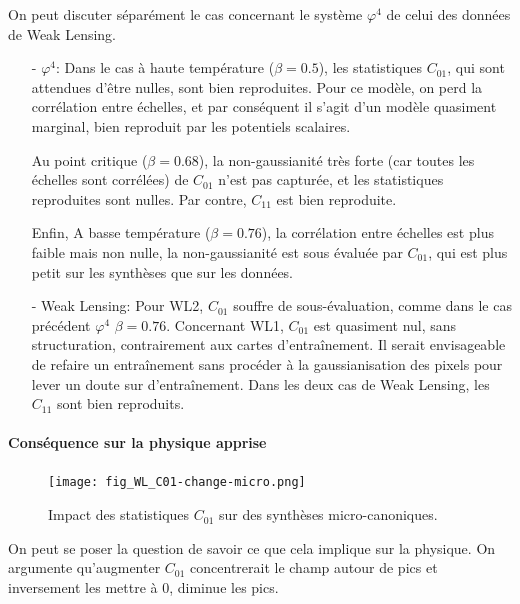 \documentclass[12pt,twoside]{article}
\begin{document}
On peut discuter séparément le cas concernant le système $\varphi^4$ de celui des données de Weak Lensing.
\begin{itemize}
\item[- $\varphi^4$:]
Dans le cas à haute température ($\beta = 0.5$), les statistiques $C_{01}$, qui sont attendues d'être nulles, sont bien reproduites. Pour ce modèle, on perd la corrélation entre échelles, et par conséquent il s'agit d'un modèle quasiment marginal, bien reproduit par les potentiels scalaires. 

Au point critique ($\beta= 0.68$), la non-gaussianité très forte (car toutes les échelles sont corrélées) de $C_{01}$ n'est pas capturée, et les statistiques reproduites sont nulles. Par contre,  $C_{11}$ est bien reproduite.

Enfin, A basse température ($\beta = 0.76$), la corrélation entre échelles est plus faible mais non nulle, la non-gaussianité est sous évaluée par $C_{01}$, qui est plus petit sur les synthèses que sur les données.

\item[- Weak Lensing:]
Pour WL2, $C_{01}$ souffre de sous-évaluation, comme dans le cas précédent $\varphi^4$  $\beta = 0.76$.  Concernant WL1, $C_{01}$ est quasiment nul, sans structuration, contrairement aux cartes d'entraînement. Il serait envisageable de refaire un entraînement sans procéder à la gaussianisation des pixels pour lever un doute sur d'entraînement. Dans les deux cas de Weak Lensing, les $C_{11}$ sont bien reproduits.
\end{itemize}

\paragraph*{Conséquence sur la physique apprise}

\begin{figure}
\centering
\texttt{[image: fig\_WL\_C01-change-micro.png]}\\
\caption{Impact des statistiques $C_{01}$ sur des synthèses micro-canoniques.}
\label{fig-WL-C01-micro_change}
\end{figure}

On peut se poser la question de savoir ce que cela implique sur la physique. On argumente qu'augmenter $C_{01}$ concentrerait le champ autour de pics et inversement les mettre à 0, diminue les pics. 
\end{document}
